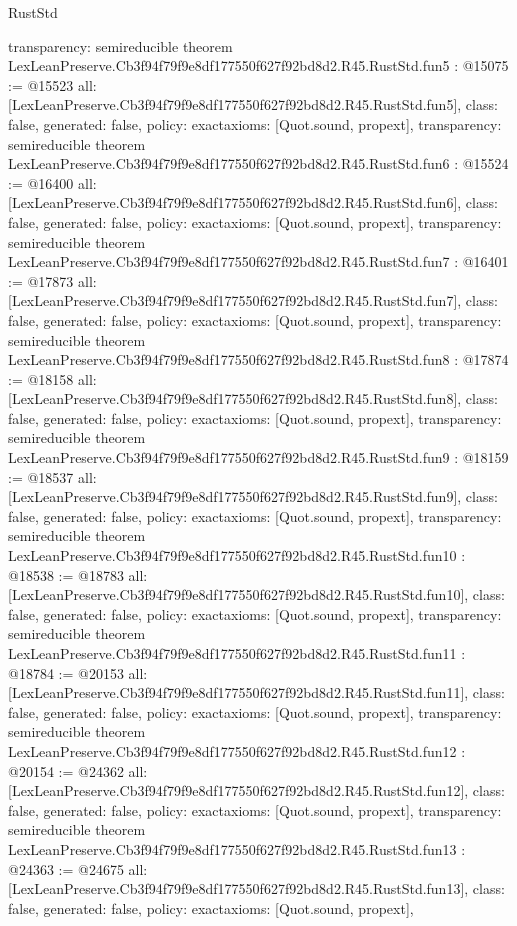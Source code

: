 \begin{lexlean}{RustStd}
\begin{coremodule}
{  transparency: semireducible
}
theorem LexLeanPreserve.Cb3f94f79f9e8df177550f627f92bd8d2.R45.RustStd.fun5 : @15075 := @15523 {
  all: [LexLeanPreserve.Cb3f94f79f9e8df177550f627f92bd8d2.R45.RustStd.fun5],
  class: false,
  generated: false,
  policy: exact{axioms: [Quot.sound, propext]},
  transparency: semireducible
}
theorem LexLeanPreserve.Cb3f94f79f9e8df177550f627f92bd8d2.R45.RustStd.fun6 : @15524 := @16400 {
  all: [LexLeanPreserve.Cb3f94f79f9e8df177550f627f92bd8d2.R45.RustStd.fun6],
  class: false,
  generated: false,
  policy: exact{axioms: [Quot.sound, propext]},
  transparency: semireducible
}
theorem LexLeanPreserve.Cb3f94f79f9e8df177550f627f92bd8d2.R45.RustStd.fun7 : @16401 := @17873 {
  all: [LexLeanPreserve.Cb3f94f79f9e8df177550f627f92bd8d2.R45.RustStd.fun7],
  class: false,
  generated: false,
  policy: exact{axioms: [Quot.sound, propext]},
  transparency: semireducible
}
theorem LexLeanPreserve.Cb3f94f79f9e8df177550f627f92bd8d2.R45.RustStd.fun8 : @17874 := @18158 {
  all: [LexLeanPreserve.Cb3f94f79f9e8df177550f627f92bd8d2.R45.RustStd.fun8],
  class: false,
  generated: false,
  policy: exact{axioms: [Quot.sound, propext]},
  transparency: semireducible
}
theorem LexLeanPreserve.Cb3f94f79f9e8df177550f627f92bd8d2.R45.RustStd.fun9 : @18159 := @18537 {
  all: [LexLeanPreserve.Cb3f94f79f9e8df177550f627f92bd8d2.R45.RustStd.fun9],
  class: false,
  generated: false,
  policy: exact{axioms: [Quot.sound, propext]},
  transparency: semireducible
}
theorem LexLeanPreserve.Cb3f94f79f9e8df177550f627f92bd8d2.R45.RustStd.fun10 : @18538 := @18783 {
  all: [LexLeanPreserve.Cb3f94f79f9e8df177550f627f92bd8d2.R45.RustStd.fun10],
  class: false,
  generated: false,
  policy: exact{axioms: [Quot.sound, propext]},
  transparency: semireducible
}
theorem LexLeanPreserve.Cb3f94f79f9e8df177550f627f92bd8d2.R45.RustStd.fun11 : @18784 := @20153 {
  all: [LexLeanPreserve.Cb3f94f79f9e8df177550f627f92bd8d2.R45.RustStd.fun11],
  class: false,
  generated: false,
  policy: exact{axioms: [Quot.sound, propext]},
  transparency: semireducible
}
theorem LexLeanPreserve.Cb3f94f79f9e8df177550f627f92bd8d2.R45.RustStd.fun12 : @20154 := @24362 {
  all: [LexLeanPreserve.Cb3f94f79f9e8df177550f627f92bd8d2.R45.RustStd.fun12],
  class: false,
  generated: false,
  policy: exact{axioms: [Quot.sound, propext]},
  transparency: semireducible
}
theorem LexLeanPreserve.Cb3f94f79f9e8df177550f627f92bd8d2.R45.RustStd.fun13 : @24363 := @24675 {
  all: [LexLeanPreserve.Cb3f94f79f9e8df177550f627f92bd8d2.R45.RustStd.fun13],
  class: false,
  generated: false,
  policy: exact{axioms: [Quot.sound, propext]},
}
\end{coremodule}
\end{lexlean}
